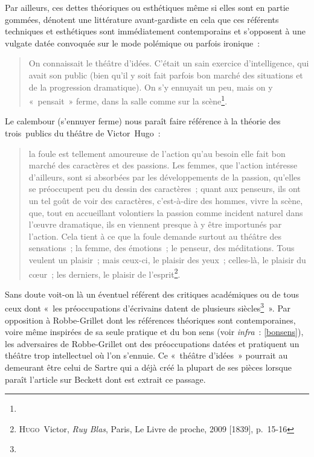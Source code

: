 \documentclass[12pt, a4paper]{article}
\begin{document}

Par ailleurs, ces dettes théoriques ou esthétiques même si elles sont en partie gommées, dénotent une littérature avant-gardiste en cela que ces référents techniques et esthétiques sont immédiatement contemporains et s'opposent à une vulgate datée convoquée sur le mode polémique ou parfois ironique~:
\begin{quote}
    On connaissait le théâtre d’idées. C’était un sain exercice d’intelligence, qui avait son public (bien qu’il y soit fait parfois bon marché des situations et de la progression dramatique). On s’y ennuyait un peu, mais on y «~pensait~» ferme, dans la salle comme sur la scène\footnote{}.
\end{quote}
Le calembour (s'ennuyer ferme) nous paraît faire référence à la théorie des trois~publics du théâtre de Victor~Hugo~:
\begin{quote}
    la foule est tellement amoureuse de l'action qu'au besoin elle fait bon marché des caractères et des passions. Les femmes, que l'action intéresse d'ailleurs, sont si absorbées par les développements de la passion, qu'elles se préoccupent peu du dessin des caractères~; quant aux penseurs, ils ont un tel goût de voir des caractères, c'est-à-dire des hommes, vivre la scène, que, tout en accueillant volontiers la passion comme incident naturel dans l'œuvre dramatique, ils en viennent presque à y être importunés par l'action. Cela tient à ce que la foule demande surtout au théâtre des sensations~; la femme, des émotions~; le penseur, des méditations. Tous veulent un plaisir~; mais ceux-ci, le plaisir des yeux~; celles-là, le plaisir du cœur~; les derniers, le plaisir de l'esprit\footnote{\textsc{Hugo}~Victor, \textit{Ruy Blas}, Paris, Le Livre de proche, 2009 [1839], p.~15-16}.
\end{quote}
Sans doute voit-on là un éventuel référent des critiques académiques ou de tous ceux dont «~les préoccupations d’écrivains datent de plusieurs siècles\footnote{}~». Par opposition à Robbe-Grillet dont les références théoriques sont contemporaines, voire même inspirées de sa seule pratique et du bon sens (voir \textit{infra}~: \ref{bonsens}), les adversaires de Robbe-Grillet ont des préoccupations datées et pratiquent un théâtre trop intellectuel où l'on s'ennuie. Ce «~théâtre d'idées~» pourrait au demeurant être celui de Sartre qui a déjà créé la plupart de ses pièces lorsque paraît l'article sur Beckett dont est extrait ce passage.
\end{document}
